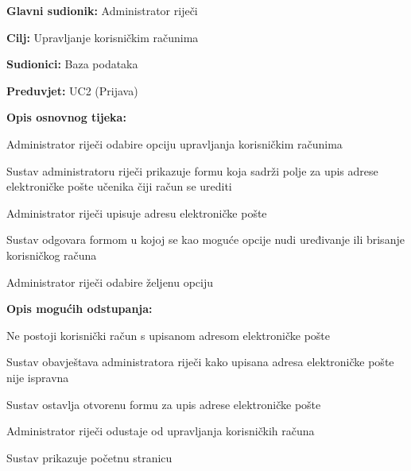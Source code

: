 				\noindent {}
				\begin{packed_item}
					
					\item \textbf{Glavni sudionik: }Administrator riječi
					\item  \textbf{Cilj:} Upravljanje korisničkim računima
					\item  \textbf{Sudionici:} Baza podataka
					\item  \textbf{Preduvjet:} UC2 (Prijava)
					\item  \textbf{Opis osnovnog tijeka:}
					
					\item[] \begin{packed_enum}
						
						\item Administrator riječi odabire opciju upravljanja korisničkim računima
						\item Sustav administratoru riječi prikazuje formu koja sadrži polje za upis adrese elektroničke pošte učenika čiji račun se urediti 
						\item Administrator riječi upisuje adresu elektroničke pošte
						\item Sustav odgovara formom u kojoj se kao moguće opcije nudi uređivanje ili brisanje korisničkog računa
						\item Administrator riječi odabire željenu opciju
						
					\end{packed_enum}
					
					\item  \textbf{Opis mogućih odstupanja:}
					
					\item[] \begin{packed_item}
						
						\item[3.a] Ne postoji korisnički račun s upisanom adresom elektroničke pošte 
						\item[] \begin{packed_enum}
							
							\item Sustav obavještava administratora riječi kako upisana adresa elektroničke pošte nije ispravna
							\item Sustav ostavlja otvorenu formu za upis adrese elektroničke pošte
							
						\end{packed_enum}
						
						\item[5.a] Administrator riječi odustaje od upravljanja korisničkih računa
						\item[] \begin{packed_enum}
							
							\item Sustav prikazuje početnu stranicu
							
						\end{packed_enum}
					\end{packed_item}
				\end{packed_item}
				
